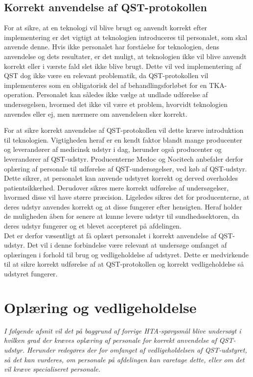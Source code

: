 \subsection{Korrekt anvendelse af QST-protokollen}
For at sikre, at en teknologi vil blive brugt og anvendt korrekt efter implementering er det vigtigt at teknologien introduceres til personalet, som skal anvende denne. Hvis ikke personalet har forståelse for teknologien, dens anvendelse og dets resultater, er det muligt, at teknologien ikke vil blive anvendt korrekt eller i værste fald slet ikke blive brugt. Dette vil ved implementering af QST dog ikke være en relevant problematik, da QST-protokollen vil implementeres som en obligatorisk del af behandlingsforløbet for en TKA-operation. Personalet kan således ikke vælge at undlade udførelse af undersøgelsen, hvormed det ikke vil være et problem, hvorvidt teknologien anvendes eller ej, men nærmere om anvendelsen sker korrekt. 

For at sikre korrekt anvendelse af QST-protokollen vil dette kræve introduktion til teknologien. Vigtigheden heraf er en kendt faktor blandt mange producenter og leverandører af medicinsk udstyr i dag, herunder også producenter og leverandører af QST-udstyr. Producenterne Medoc og Nocitech anbefaler derfor oplæring af personale til udførelse af QST-undersøgelser, ved køb af QST-udstyr. Dette sikrer, at personalet kan anvende udstyret korrekt og derved overholdes patientsikkerhed. Derudover sikres mere korrekt udførelse af undersøgelser, hvormed disse vil have større præcision. Ligeledes sikres det for producenterne, at deres udstyr anvendes korrekt og at disse fungerer efter hensigten. Heraf holder de muligheden åben for senere at kunne levere udstyr til sundhedssektoren, da deres udstyr fungerer og et blevet accepteret på afdelingen. \\
Det er derfor væsentligt at få oplært personalet i korrekt anvendelse af QST-udstyr. Det vil i denne forbindelse være relevant at undersøge omfanget af oplæringen i forhold til brug og vedligeholdelse af udstyret. Dette er medvirkende til at sikre korrekt udførelse af at QST-protokollen og korrekt vedligeholdelse så udstyret fungerer.

\section{Oplæring og vedligeholdelse}
\textit{I følgende afsnit vil det på baggrund af forrige HTA-spørgsmål blive undersøgt i hvilken grad der kræves oplæring af personale for korrekt anvendelse af QST-udstyr. Herunder redegøres der for omfanget af vedligeholdelsen af QST-udstyret, så det kan vurderes, om personale på afdelingen kan varetage dette, eller om det vil kræve specialiseret personale.}

